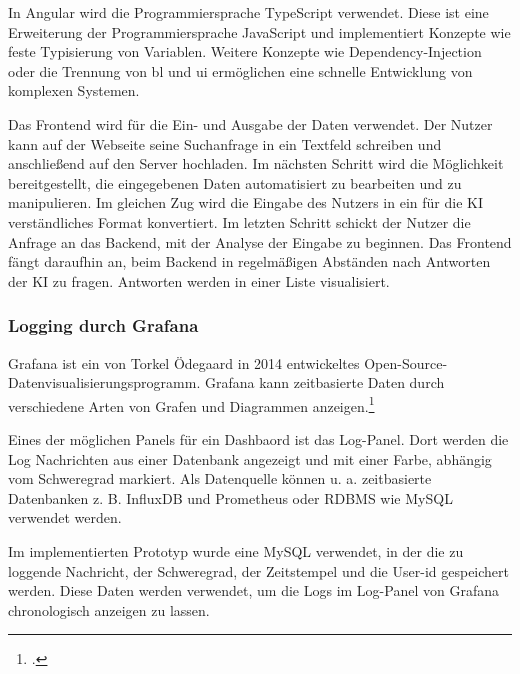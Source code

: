 In Angular wird die Programmiersprache TypeScript verwendet. Diese ist eine Erweiterung der Programmiersprache JavaScript und implementiert Konzepte wie feste Typisierung von Variablen. Weitere Konzepte wie Dependency-Injection oder die Trennung von \ac{bl} und \ac{ui} ermöglichen eine schnelle Entwicklung von komplexen Systemen. 

Das Frontend wird für die Ein- und Ausgabe der Daten verwendet. Der Nutzer kann auf der Webseite seine Suchanfrage in ein Textfeld schreiben und anschließend auf den Server hochladen. Im nächsten Schritt wird die Möglichkeit bereitgestellt, die eingegebenen Daten automatisiert zu bearbeiten und zu manipulieren. Im gleichen Zug wird die Eingabe des Nutzers in ein für die KI verständliches Format konvertiert. Im letzten Schritt schickt der Nutzer die Anfrage an das Backend, mit der Analyse der Eingabe zu beginnen. Das Frontend fängt daraufhin an, beim Backend in regelmäßigen Abständen nach Antworten der KI zu fragen. Antworten werden in einer Liste visualisiert.

\subsubsection{Logging durch Grafana}
Grafana ist ein von Torkel Ödegaard in 2014 entwickeltes Open-Source-Datenvisualisierungsprogramm. Grafana kann zeitbasierte Daten durch verschiedene Arten von Grafen und Diagrammen anzeigen.\footcite{chakraborty2021grafana}

Eines der möglichen Panels für ein Dashbaord ist das Log-Panel. Dort werden die Log Nachrichten aus einer Datenbank angezeigt und mit einer Farbe, abhängig vom Schweregrad markiert. Als Datenquelle können u. a. zeitbasierte Datenbanken z. B. InfluxDB und Prometheus oder RDBMS wie MySQL verwendet werden.

Im implementierten Prototyp wurde eine MySQL verwendet, in der die zu loggende Nachricht, der Schweregrad, der Zeitstempel und die User-\ac{id} gespeichert werden. Diese Daten werden verwendet, um die Logs im Log-Panel von Grafana chronologisch anzeigen zu lassen.

